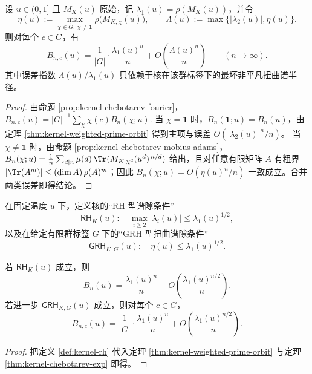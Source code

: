 \begin{theorem}\label{thm:kernel-chebotarev-exp}
设 $u\in(0,1]$ 且 $M_K(u)$ 原始，记 $\lambda_1(u)=\rho(M_K(u))$，并令
\[
\eta(u):=\max_{\chi\in\widehat G,\ \chi\ne\mathbf{1}}\rho\bigl(M_{K,\chi}(u)\bigr),
\qquad
\Lambda(u):=\max\{|\lambda_2(u)|,\eta(u)\}.
\]
则对每个 $c\in G$，有
\[
B_{n,c}(u)=\frac{1}{|G|}\cdot\frac{\lambda_1(u)^n}{n}+O\!\left(\frac{\Lambda(u)^n}{n}\right)\qquad(n\to\infty).
\]
其中误差指数 $\Lambda(u)/\lambda_1(u)$ 只依赖于核在该群标签下的最坏非平凡扭曲谱半径。
\end{theorem}

\begin{proof}
由命题 \ref{prop:kernel-chebotarev-fourier}，
\(
B_{n,c}(u)=|G|^{-1}\sum_{\chi}\overline{\chi(c)}B_n(\chi;u).
\)
当 $\chi=\mathbf{1}$ 时，$B_n(\mathbf{1};u)=B_n(u)$，由定理 \ref{thm:kernel-weighted-prime-orbit} 得到主项与误差 $O(|\lambda_2(u)|^n/n)$。
当 $\chi\ne\mathbf{1}$ 时，由命题 \ref{prop:kernel-chebotarev-mobius-adams}，
\(
B_n(\chi;u)=\frac{1}{n}\sum_{d\mid n}\mu(d)\,\Tr(M_{K,\chi^d}(u^d)^{\,n/d})
\)
给出，且对任意有限矩阵 $A$ 有粗界 $|\Tr(A^m)|\le (\dim A)\,\rho(A)^m$；因此
\(
B_n(\chi;u)=O(\eta(u)^n/n)
\)
一致成立。合并两类误差即得结论。
\end{proof}

\begin{definition}\label{def:kernel-rh}
在固定温度 $u$ 下，定义核的“RH 型谱隙条件”
\[
\textsf{RH}_K(u):\quad \max_{i\ge 2}|\lambda_i(u)|\le \lambda_1(u)^{1/2},
\]
以及在给定有限群标签 $G$ 下的“GRH 型扭曲谱隙条件”
\[
\textsf{GRH}_{K,G}(u):\quad \eta(u)\le \lambda_1(u)^{1/2}.
\]
\end{definition}

\begin{corollary}\label{cor:kernel-rh-sqrt-error}
若 $\textsf{RH}_K(u)$ 成立，则
\[
B_n(u)=\frac{\lambda_1(u)^n}{n}+O\!\left(\frac{\lambda_1(u)^{n/2}}{n}\right).
\]
若进一步 $\textsf{GRH}_{K,G}(u)$ 成立，则对每个 $c\in G$，
\[
B_{n,c}(u)=\frac{1}{|G|}\cdot\frac{\lambda_1(u)^n}{n}+O\!\left(\frac{\lambda_1(u)^{n/2}}{n}\right).
\]
\end{corollary}

\begin{proof}
把定义 \ref{def:kernel-rh} 代入定理 \ref{thm:kernel-weighted-prime-orbit} 与定理 \ref{thm:kernel-chebotarev-exp} 即得。
\end{proof}


